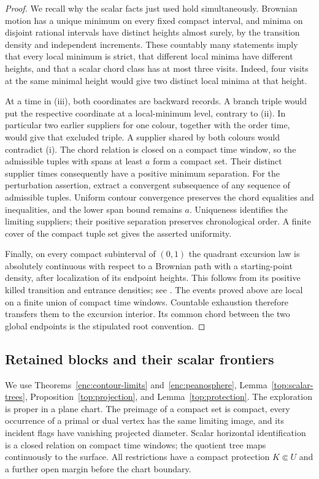 \documentclass[11pt]{article}
\numberwithin{equation}{section}
\theoremstyle{definition}
\theoremstyle{remark}
\newcommand{\1}{\mathbf 1}
\begin{document}
\begin{proof}
We recall why the scalar facts just used hold simultaneously.  Brownian
motion has a unique minimum on every fixed compact interval, and minima
on disjoint rational intervals have distinct heights almost surely,
by the transition density and independent increments.  These countably
many statements imply that every local minimum is strict, that different
local minima have different heights, and that a scalar chord class has
at most three visits.  Indeed, four visits at the same minimal height
would give two distinct local minima at that height.

At a time in (iii), both coordinates are backward records.  A branch
triple would put the respective coordinate at a local-minimum level,
contrary to (ii).  In particular two earlier suppliers for one colour,
together with the order time, would give that excluded triple.
A supplier shared by both colours would contradict (i).
The chord relation is closed on a compact time window, so the
admissible tuples with spans at least $a$ form a compact set.  Their
distinct supplier times consequently have a positive minimum separation.
For the perturbation assertion, extract a convergent subsequence of
any sequence of admissible tuples.  Uniform contour convergence
preserves the chord equalities and inequalities, and the lower span
bound remains $a$.  Uniqueness identifies the limiting suppliers;
their positive separation preserves chronological order.  A finite
cover of the compact tuple set gives the asserted uniformity.

Finally, on every compact subinterval of $(0,1)$ the quadrant excursion
law is absolutely continuous with respect to a Brownian path with a
starting-point density, after localization of its endpoint heights.
This follows from its positive killed transition and entrance densities;
see \cite[Section 2]{GwynneSunFKIII}.  The events proved above are local
on a finite union of compact time windows.  Countable exhaustion
therefore transfers them to the excursion interior.  Its common chord
between the two global endpoints is the stipulated root convention.
\end{proof}

\subsection{Retained blocks and their scalar frontiers}

We use Theorems~\ref{enc:contour-limits} and~\ref{enc:peanosphere},
Lemma~\ref{top:scalar-trees}, Proposition~\ref{top:projection},
and Lemma~\ref{top:protection}.  The exploration is proper in a plane chart.
The preimage of a compact set is compact, every occurrence of a primal
or dual vertex has the same limiting image, and its incident flags have
vanishing projected diameter.  Scalar horizontal identification is a
closed relation on compact time windows; the quotient tree maps
continuously to the surface.  All restrictions have a compact protection
\(K\Subset U\) and a further open margin before the chart boundary.
\end{document}
